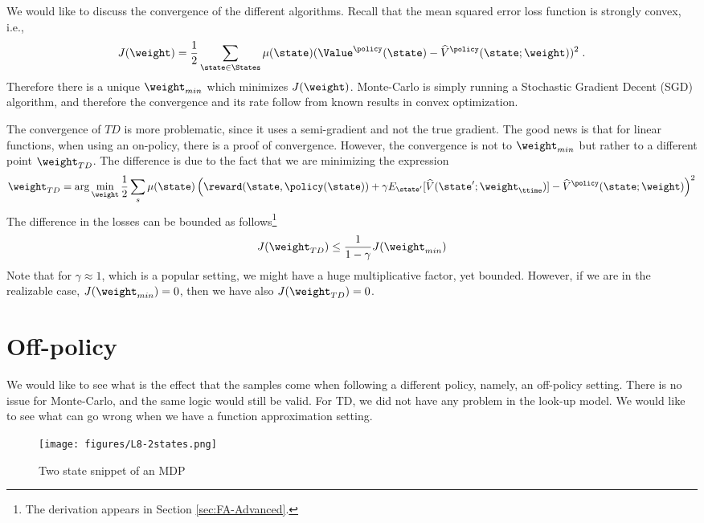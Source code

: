 
We would like to discuss the convergence of the different
algorithms. Recall that the mean squared error loss function is
strongly convex, i.e.,
\[
J(\weight)=\frac{1}{2}\sum_{\state\in\States}
\mu(\state)(\Value^\policy(\state)-\widehat{V}^\policy(\state;\weight))^2\;.
\]
Therefore there is a unique $\weight_{min}$ which minimizes
$J(\weight)$. Monte-Carlo is simply running a Stochastic Gradient
Decent (SGD) algorithm, and therefore the convergence and its rate
follow from known results in convex optimization.

The convergence of $TD$ is more problematic, since it uses a
semi-gradient and not the true gradient. The good news is that for
linear functions, when using an on-policy, there is a proof of
convergence. However, the convergence is not to $\weight_{min}$ but
rather to a different point $\weight_{TD}$. The difference is due to
the fact that we are minimizing the expression
\[
\weight_{TD}=\arg\min_\weight\frac{1}{2}\sum_s
\mu(\state)\left(\reward(\state,\policy(\state))+\gamma
E_{\state'}[\widehat{V}(\state';\weight_\ttime)]-\widehat{V}^\policy(\state;\weight)\right)^2
\]
The difference in the losses can be bounded as follows\footnote{ The
derivation appears in Section \ref{sec:FA-Advanced}.}
\[
J(\weight_{TD})\leq \frac{1}{1-\gamma}J(\weight_{min})
\]
Note that for $\gamma\approx 1$, which is a popular setting, we
might have a huge multiplicative factor, yet bounded. However, if we
are in the realizable case, $J(\weight_{min})=0$, then we have also
$J(\weight_{TD})=0$.




\section{Off-policy}
\label{sec:TD-FA}

We would like to see what is the effect that the samples come when
following a different policy, namely, an off-policy setting. There
is no issue for Monte-Carlo, and the same logic would still be
valid.  For TD, we did not have any problem in the look-up model. We
would like to see what can go wrong when we have a function
approximation setting.


\begin{figure}
  \begin{centering}
  \texttt{[image: figures/L8-2states.png]}\\
  \caption{Two state snippet of an MDP }\label{fig:L8-2state}
  \end{centering}
\end{figure}

